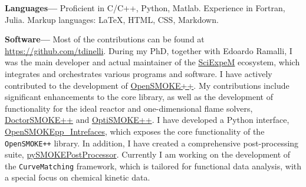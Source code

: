 {\bf Languages---}
Proficient in C/C++, Python, Matlab. Experience in Fortran, Julia. Markup languages:
\LaTeX, HTML, CSS, Markdown.


{\bf Software---}%
Most of the contributions can be found at \url{https://github.com/tdinelli}. During my
PhD, together with Edoardo Ramalli, I was the main developer and actual maintainer of the
\href{https://sciexpem.polimi.it/}{SciExpeM} ecosystem, which integrates and orchestrates
various programs and software. I have actively contributed to the development of
\href{https://www.opensmokepp.polimi.it/}{OpenSMOKE++}. My contributions include
significant enhancements to the core library, as well as the development of functionality
for the ideal reactor and one-dimensional flame solvers, \href{https://www.opensmokepp.polimi.it/}{DoctorSMOKE++} and
\href{https://github.com/burn-research/OptiSMOKE_toolbox}{OptiSMOKE++}. I have
developed a Python interface,
\href{https://github.com/tdinelli/OpenSMOKEpp_Interfaces}{OpenSMOKEpp\_Intrefaces}, which
exposes the core functionality of the {\tt OpenSMOKE++} library. In addition, I have
created a comprehensive post-processing suite,
\href{https://github.com/tdinelli/pySMOKEPostProcessor}{pySMOKEPostProcessor}. Currently I
am working on the development of the \texttt{CurveMatching} framework, which is tailored
for functional data analysis, with a special focus on chemical
kinetic data.

